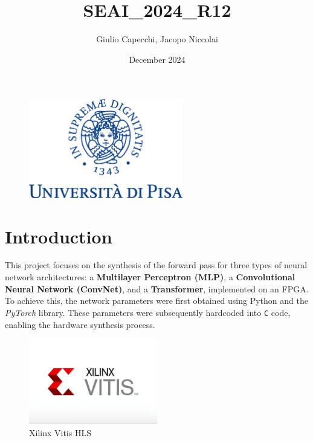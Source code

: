 \documentclass{article}
\title{SEAI\_2024\_R12}
\author{Giulio Capecchi, Jacopo Niccolai}
\date{December 2024}
\begin{document}
\maketitle

\vspace{3cm}
\begin{figure}[H]
    \centering
    \includegraphics[width=0.6\textwidth]{assets/unipi.png}
    \label{fig:unipi_logo}
\end{figure}

\newpage

\tableofcontents

\newpage

\section{Introduction}
This project focuses on the synthesis of the forward pass for three types of neural network architectures: a \textbf{Multilayer Perceptron (MLP)}, a \textbf{Convolutional Neural Network (ConvNet)}, and a \textbf{Transformer}, implemented on an FPGA.  
To achieve this, the network parameters were first obtained using Python and the \textit{PyTorch} library. These parameters were subsequently hardcoded into \texttt{C} code, enabling the hardware synthesis process.


\begin{figure}[H]
    \centering
    \includegraphics[width=0.5\textwidth]{assets/vitis-hls.png}
    \caption{Xilinx Vitis HLS}
    \label{fig:vitis_hls}
\end{figure}
\end{document}
